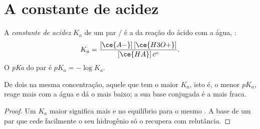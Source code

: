 \section{A constante de acidez}

\begin{definition}\label{def:g12:ka-and-pka:ka}
A \emph{constante de acidez} $K_a$ de um par
/ é a  da reação do ácido com a
água, :
\[
  K_a = \frac{[\ce{A-}]\,[\ce{H3O+}]}{[\ce{HA}]\,c^\circ} .
\]
O \emph{pKa} do par é
$pK_a = -\log K_a$.
\end{definition}

\begin{proposition}\label{prop:g12:ka-and-pka:compare}
De dois  na mesma concentração, aquele que tem o maior
$K_a$, isto é, o menor $pK_a$, reage mais com a água e dá o  mais
baixo; a sua base conjugada é a mais fraca.
\end{proposition}

\begin{proof}
Um $K_a$ maior significa mais  e  no equilíbrio para o
mesmo . A base  de um par que cede facilmente o seu 
hidrogênio só o recupera com relutância.
\end{proof}

